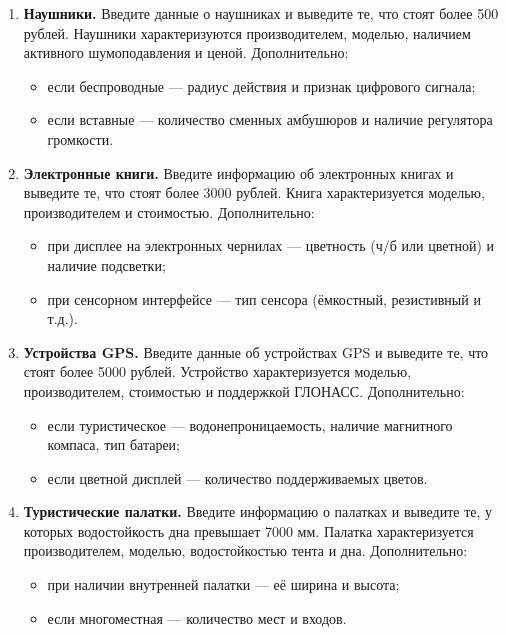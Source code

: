 \begin{enumerate}
    \item \textbf{Наушники.}  
    Введите данные о наушниках и выведите те, что стоят более 500 рублей.  
    Наушники характеризуются производителем, моделью, наличием активного шумоподавления и ценой.  
    Дополнительно:
    \begin{itemize}
        \item если беспроводные — радиус действия и признак цифрового сигнала;
        \item если вставные — количество сменных амбушюров и наличие регулятора громкости.
    \end{itemize}

    \item \textbf{Электронные книги.}  
    Введите информацию об электронных книгах и выведите те, что стоят более 3000 рублей.  
    Книга характеризуется моделью, производителем и стоимостью.  
    Дополнительно:
    \begin{itemize}
        \item при дисплее на электронных чернилах — цветность (ч/б или цветной) и наличие подсветки;
        \item при сенсорном интерфейсе — тип сенсора (ёмкостный, резистивный и т.д.).
    \end{itemize}

    \item \textbf{Устройства GPS.}  
    Введите данные об устройствах GPS и выведите те, что стоят более 5000 рублей.  
    Устройство характеризуется моделью, производителем, стоимостью и поддержкой ГЛОНАСС.  
    Дополнительно:
    \begin{itemize}
        \item если туристическое — водонепроницаемость, наличие магнитного компаса, тип батареи;
        \item если цветной дисплей — количество поддерживаемых цветов.
    \end{itemize}

    \item \textbf{Туристические палатки.}  
    Введите информацию о палатках и выведите те, у которых водостойкость дна превышает 7000 мм.  
    Палатка характеризуется производителем, моделью, водостойкостью тента и дна.  
    Дополнительно:
    \begin{itemize}
        \item при наличии внутренней палатки — её ширина и высота;
        \item если многоместная — количество мест и входов.
    \end{itemize}


\end{enumerate}
